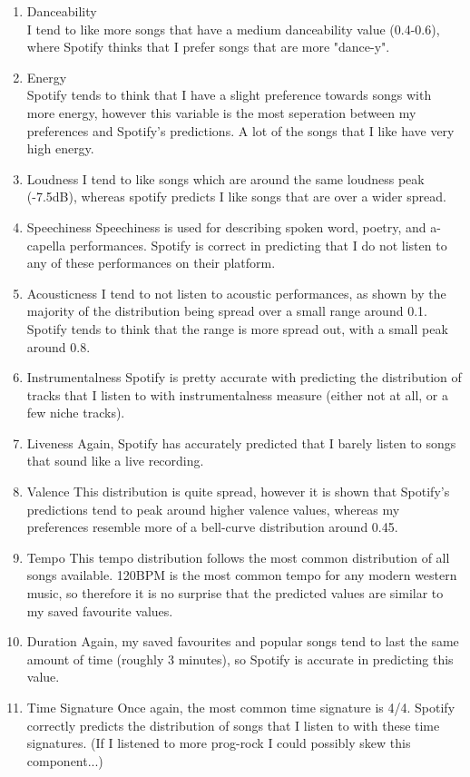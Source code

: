 \documentclass{article}
\begin{document}
		\begin{enumerate}
			\item Danceability \\
				I tend to like more songs that have a medium danceability value (0.4-0.6), where Spotify thinks that I prefer songs that are more "dance-y".
			\item Energy \\
				Spotify tends to think that I have a slight preference towards songs with more energy, however this variable is the most seperation between my preferences and Spotify's predictions. A lot of the songs that I like have very high energy.
			\item Loudness
				I tend to like songs which are around the same loudness peak (-7.5dB), whereas spotify predicts I like songs that are over a wider spread.
			\item Speechiness
				Speechiness is used for describing spoken word, poetry, and a-capella performances. Spotify is correct in predicting that I do not listen to any of these performances on their platform.
			\item Acousticness
				I tend to not listen to acoustic performances, as shown by the majority of the distribution being spread over a small range around 0.1. Spotify tends to think that the range is more spread out, with a small peak around 0.8.
			\item Instrumentalness
				Spotify is pretty accurate with predicting the distribution of tracks that I listen to with instrumentalness measure (either not at all, or a few niche tracks).
			\item Liveness
				Again, Spotify has accurately predicted that I barely listen to songs that sound like a live recording.
			\item Valence
				This distribution is quite spread, however it is shown that Spotify's predictions tend to peak around higher valence values, whereas my preferences resemble more of a bell-curve distribution around 0.45.
			\item Tempo
				This tempo distribution follows the most common distribution of all songs available. 120BPM is the most common tempo for any modern western music, so therefore it is no surprise that the predicted values are similar to my saved favourite values.
			\item Duration
				Again, my saved favourites and popular songs tend to last the same amount of time (roughly 3 minutes), so Spotify is accurate in predicting this value.
			\item Time Signature
				Once again, the most common time signature is 4/4. Spotify correctly predicts the distribution of songs that I listen to with these time signatures. (If I listened to more prog-rock I could possibly skew this component...)
		\end{enumerate}
    
\end{document}
